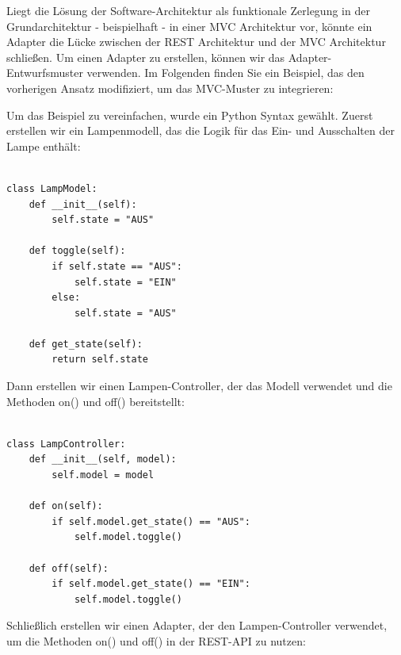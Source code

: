 Liegt die Lösung der Software-Architektur als funktionale Zerlegung in der Grundarchitektur - beispielhaft - in einer MVC Architektur vor, könnte ein Adapter die Lücke zwischen der REST Architektur und der MVC Architektur schließen. Um einen Adapter zu erstellen, können wir das Adapter-Entwurfsmuster verwenden. Im Folgenden finden Sie ein Beispiel, das den vorherigen Ansatz modifiziert, um das MVC-Muster zu integrieren:


Um das Beispiel zu vereinfachen, wurde ein Python Syntax gewählt. Zuerst erstellen wir ein Lampenmodell, das die Logik für das Ein- und Ausschalten der Lampe enthält:\\\\
\noindent\begin{minipage}{\textwidth}
\begin{lstlisting}[caption={LampModel},captionpos=b,label={lst:lamp_m}]
class LampModel:
    def __init__(self):
        self.state = "AUS"

    def toggle(self):
        if self.state == "AUS":
            self.state = "EIN"
        else:
            self.state = "AUS"

    def get_state(self):
        return self.state

\end{lstlisting}
\end{minipage}
Dann erstellen wir einen Lampen-Controller, der das Modell verwendet und die Methoden on() und off() bereitstellt:\\\\
\noindent\begin{minipage}{\textwidth}
\begin{lstlisting}[caption={LampController},captionpos=b,label={lst:lamp_c}]
class LampController:
    def __init__(self, model):
        self.model = model

    def on(self):
        if self.model.get_state() == "AUS":
            self.model.toggle()

    def off(self):
        if self.model.get_state() == "EIN":
            self.model.toggle()
\end{lstlisting}
\end{minipage}
Schließlich erstellen wir einen Adapter, der den Lampen-Controller verwendet, um die Methoden on() und off() in der REST-API zu nutzen:\\\\
